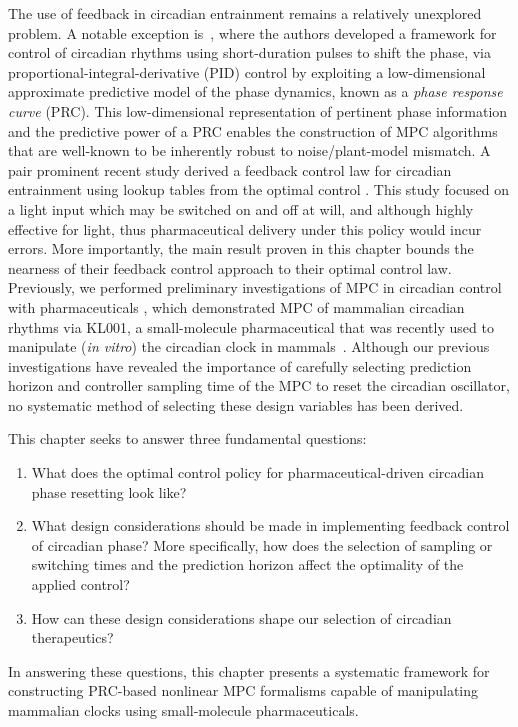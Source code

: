 The use of feedback in circadian entrainment remains a relatively unexplored problem. A notable exception is~\cite{Efimov2009}, where the authors developed a framework for control of circadian rhythms using short-duration pulses to shift the phase, via proportional-integral-derivative (PID) control by exploiting a low-dimensional approximate predictive model of the phase dynamics, known as a \textit{phase response curve} (PRC).
This low-dimensional representation of pertinent phase information and the predictive power of a PRC enables the construction of MPC algorithms that are well-known to be inherently robust to noise/plant-model mismatch.
A pair prominent recent study derived a feedback control law for circadian entrainment using lookup tables from the optimal control \cite{Qiao2017}.
This study focused on a light input which may be switched on and off at will, and although highly effective for light, thus pharmaceutical delivery under this policy would incur errors.
More importantly, the main result proven in this chapter bounds the nearness of their feedback control approach to their optimal control law.
Previously, we performed preliminary investigations of MPC in circadian control with pharmaceuticals \cite{Abel2016b,Abel2017a}, which  demonstrated MPC of mammalian circadian rhythms via KL001, a small-molecule pharmaceutical that was recently used to manipulate (\textit{in vitro}) the circadian clock in mammals~\cite{Hirota2010, Hirota2012a}.
Although our previous investigations have revealed the importance of carefully selecting prediction horizon and controller sampling time of the MPC to reset the circadian oscillator, no systematic method of selecting these design variables has been derived.

This chapter seeks to answer three fundamental questions:
\begin{enumerate}
    \item What does the optimal control policy for pharmaceutical-driven circadian phase resetting look like?
    \item What design considerations should be made in implementing feedback control of circadian phase? More specifically, how does the selection of sampling or switching times and the prediction horizon affect the optimality of the applied control?
    \item How can these design considerations shape our selection of circadian therapeutics?
\end{enumerate}
In answering these questions, this chapter presents a systematic framework for constructing PRC-based nonlinear MPC formalisms capable of manipulating mammalian clocks using small-molecule pharmaceuticals.


